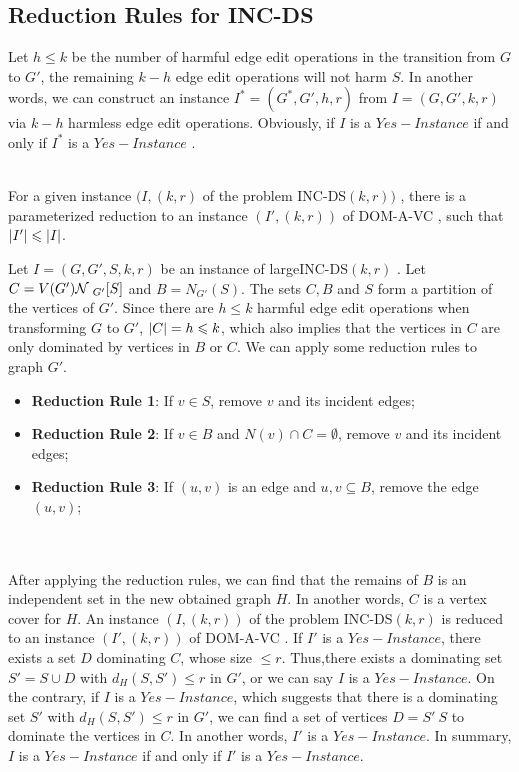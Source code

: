 \subsection{Reduction Rules for \large{I}\normalsize{NC}-\large{DS}}
Let $h\leqslant k$ be the number of harmful edge edit operations in the transition from $G$ to $G'$, the remaining $k-h$ edge edit operations will not harm $S$. In another words, we can construct an instance $I^{*} = (G^{*}, G', h, r)$ from $I = (G, G', k, r)$ via $k-h$ harmless edge edit operations. Obviously, if $I$ is a $Yes-Instance$ if and only if $I^{*}$ is a $Yes-Instance$ \cite{downey2014}.
\\
\\
\begin{lem}
\label{lem:incds2dvc}
For a given instance $(I,(k,r)$ of the problem \large{I}\normalsize{NC}-\large{DS}$(k,r))$ \normalsize{}, there is a parameterized reduction to an instance $(I',(k,r))$ of \large{D}\normalsize{OM}-\large{A}-\large{VC} \normalsize{}, such that $\left| I' \right| \leqslant \left| I \right|$.
\cite{downey2014}
\end{lem}
Let $I = (G, G',S, k, r)$ be an instance of large{I}\normalsize{NC}-\large{DS}$(k,r)$ \normalsize{}. Let $C=V(G'){\mathcal{N}}\;_{G'}[S]$ and $B=N_{G'}(S)$. The sets $C, B$ and $S$ form a partition of the vertices of $G'$. Since there are $h \leqslant k$ harmful edge edit operations when transforming $G$ to $G'$, $\left| C \right|=h\leqslant k$, which also implies that the vertices in $C$ are only dominated by vertices in $B$ or $C$. We can apply some reduction rules to graph $G'$.
\begin{itemize}
  \item \textbf{Reduction Rule 1}: If $v \in S$, remove $v$ and its incident edges;
  \item \textbf{Reduction Rule 2}: If $v \in B$ and $N(v) \cap C = \emptyset$, remove $v$ and its incident edges;
  \item \textbf{Reduction Rule 3}: If $(u,v)$ is an edge and ${u, v} \subseteq B$, remove the edge $(u,v)$;
\end{itemize}
\cite{downey2014}
\\
\\
After applying the reduction rules, we can find that the remains of $B$ is an independent set in the new obtained graph $H$. In another words, $C$ is a vertex cover for $H$. An instance $(I,(k,r))$ of the problem \large{I}\normalsize{NC}-\large{DS}$(k,r)$  \normalsize{} is reduced to an instance $(I',(k,r))$ of \large{D}\normalsize{OM}-\large{A}-\large{VC} \normalsize{}. If $I'$ is a $Yes-Instance$, there exists a set $D$ dominating $C$, whose size $\leqslant r$. Thus,there exists a dominating set $S'=S \cup D$ with $d_{H}(S,S') \leqslant r$ in $G'$, or we can say $I$ is a $Yes-Instance$. On the contrary, if $I$ is a $Yes-Instance$, which suggests that there is a dominating set $S'$ with $d_{H}(S,S') \leqslant r$ in $G'$, we can find a set of vertices $D= S' \ S$ to dominate the vertices in $C$. In another words, $I'$ is a $Yes-Instance$. In summary, $I$ is a $Yes-Instance$ if and only if $I'$ is a $Yes-Instance$.
\\
\\
